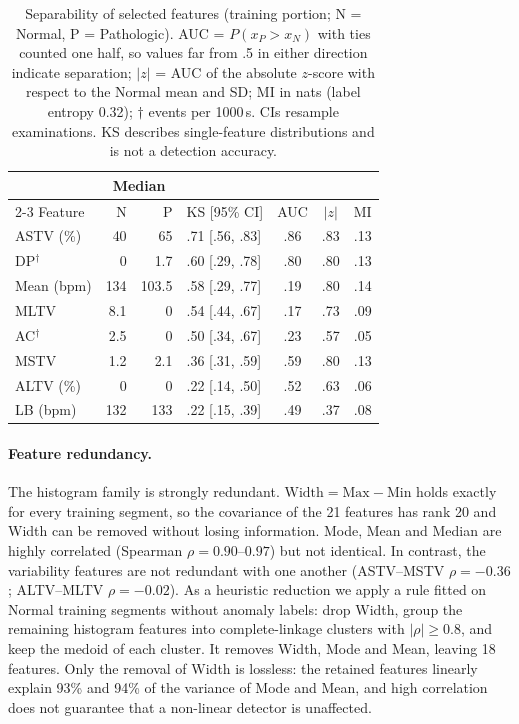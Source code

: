 \begin{table}[t]
\centering
\small
\setlength{\tabcolsep}{2.4pt}
\begin{tabular}{lrrlccc}
\toprule
 & \multicolumn{2}{c}{Median} & & & & \\
\cmidrule(lr){2-3}
Feature & N & P & KS [95\% CI] & AUC & $|z|$ & MI \\
\midrule
ASTV (\%)     & 40    & 65    & .71 [.56, .83] & .86 & .83 & .13 \\
DP$^{\dagger}$ & 0 & 1.7   & .60 [.29, .78] & .80 & .80 & .13 \\
Mean (bpm)    & 134   & 103.5 & .58 [.29, .77] & .19 & .80 & .14 \\
MLTV          & 8.1   & 0     & .54 [.44, .67] & .17 & .73 & .09 \\
AC$^{\dagger}$ & 2.5 & 0   & .50 [.34, .67] & .23 & .57 & .05 \\
MSTV          & 1.2   & 2.1   & .36 [.31, .59] & .59 & .80 & .13 \\
ALTV (\%)     & 0     & 0     & .22 [.14, .50] & .52 & .63 & .06 \\
LB (bpm)      & 132   & 133   & .22 [.15, .39] & .49 & .37 & .08 \\
\bottomrule
\end{tabular}
\caption{Separability of selected features (training portion; N = Normal,
P = Pathologic). AUC = $P(x_P > x_N)$ with ties counted one half, so values
far from .5 in either direction indicate separation; $|z|$ = AUC of the
absolute $z$-score with respect to the Normal mean and SD; MI in nats (label
entropy 0.32); $\dagger$ events per 1000\,s. CIs resample examinations. KS
describes single-feature distributions and is not a detection accuracy.}
\label{tab:sep}
\end{table}

\paragraph{Feature redundancy.}
The histogram family is strongly redundant. $\mathrm{Width}=\mathrm{Max}-\mathrm{Min}$
holds exactly for every training segment, so the covariance of the 21 features
has rank 20 and Width can be removed without losing information. Mode, Mean
and Median are highly correlated (Spearman $\rho=0.90$--$0.97$) but not
identical. In contrast, the variability features are not redundant with one
another (ASTV--MSTV $\rho=-0.36$; ALTV--MLTV $\rho=-0.02$). As a heuristic
reduction we apply a rule fitted on Normal training segments without anomaly
labels: drop Width, group the remaining histogram features into
complete-linkage clusters with $|\rho|\ge 0.8$, and keep the medoid of each
cluster. It removes Width, Mode and Mean, leaving 18 features. Only the
removal of Width is lossless: the retained features linearly explain 93\% and
94\% of the variance of Mode and Mean, and high correlation does not guarantee
that a non-linear detector is unaffected.

